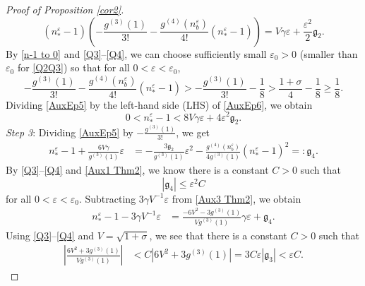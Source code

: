 \documentclass{amsart}
\newcommand{\veps}{\varepsilon}
\numberwithin{equation}{section}
\theoremstyle{plain}%
\theoremstyle{definition}
\theoremstyle{remark}
\theoremstyle{remark}
\begin{document}
\begin{proof}[Proof of Proposition \ref{cor2}]
\begin{equation}\label{AuxEp5}
(n_\ast^\veps-1)\left(-\frac{g^{(3)}(1)}{3!} - \frac{g^{(4)}(n_b^\veps)}{4!}(n_\ast^\veps-1) \right) =  V\gamma\veps + \frac{\veps^2}{2}\mathfrak{g}_2.
\end{equation}
By \eqref{n-1 to 0} and \eqref{Q3}--\eqref{Q4}, we can choose sufficiently small $\veps_0>0$ (smaller than $\veps_0$ for \eqref{Q2Q3}) so that for all $0<\veps<\veps_{0}$,  
\begin{equation}\label{AuxEp6}
-\frac{g^{(3)}(1)}{3!} - \frac{g^{(4)}(n_b^\veps)}{4!}(n_\ast^\veps-1)>-\frac{g^{(3)}(1)}{3!} - \frac{1}{8} > \frac{1+\sigma}{4} - \frac{1}{8} \geq \frac{1}{8}.
\end{equation}
Dividing \eqref{AuxEp5} by the left-hand side (LHS) of \eqref{AuxEp6},  we obtain
\begin{equation}\label{Aux1 Thm2}
0<n_\ast^\veps-1 <  8V \gamma\veps + 4\veps^2\mathfrak{g}_2.
\end{equation}
\textit{Step 3}: Dividing \eqref{AuxEp5} by $-\frac{g^{(3)}(1)}{3!}$, we get
\begin{equation}\label{Aux3 Thm2}
\begin{split}
n_\ast^\veps-1 +\frac{6V\gamma}{g^{(3)}(1)}\veps
& =  - \frac{3\mathfrak{g}_2}{g^{(3)}(1)}\veps^2 - \frac{g^{(4)}(n_b^\veps)}{4g^{(3)}(1)}(n_\ast^\veps-1)^2 =: \mathfrak{g}_4.
\end{split}
\end{equation}
By \eqref{Q3}--\eqref{Q4} and \eqref{Aux1 Thm2}, we know  there is a constant $C>0$ such that 
\begin{equation}\label{C_1tilde}
|\mathfrak{g}_4| \leq \veps^2 C
\end{equation}
for all $0<\veps<\veps_0$.  Subtracting $3\gamma V^{-1}\veps$ from \eqref{Aux3 Thm2}, we obtain 
\begin{equation}\label{Aux2 Thm2}
\begin{split}
n_\ast^\veps-1- 3\gamma V^{-1}\veps
& = \frac{-6V^2-3g^{(3)}(1)}{Vg^{(3)}(1)} \gamma\veps + \mathfrak{g}_4.
\end{split}
\end{equation}
Using \eqref{Q3}--\eqref{Q4} and $V=\sqrt{1+\sigma}$, we see that there is a constant $C>0$ such that
\begin{equation}\label{C_1tilde1}
\begin{split}
\left| \frac{6V^2+3g^{(3)}(1)}{Vg^{(3)}(1)} \right| 
& < C|6V^2+3g^{(3)}(1)| = 3C\veps|\mathfrak{g}_3| < \veps C.
\end{split}
\end{equation}

\end{proof}
\end{document}
